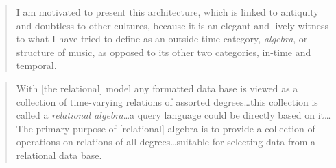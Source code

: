 \begin{quote}
	I am motivated to present this architecture, which is linked to antiquity and doubtless to other cultures, because it is an elegant and lively witness to what I have tried to define as an outside-time category, \textit{algebra}, or structure of music, as opposed to its other two categories, in-time and temporal. \im \parencite[192]{Xen92:For}
\end{quote}

\begin{quote}
	With [the relational] model any formatted data base is viewed as a collection of time-varying relations of assorted degrees\dots this collection is called a \textit{relational algebra}\dots a query language could be directly based on it\dots The primary purpose of [relational] algebra is to provide a collection of operations on relations of all degrees\dots suitable for selecting data from a relational data base. \im \parencite[1-5]{Codd72relationalcompleteness}
\end{quote}

